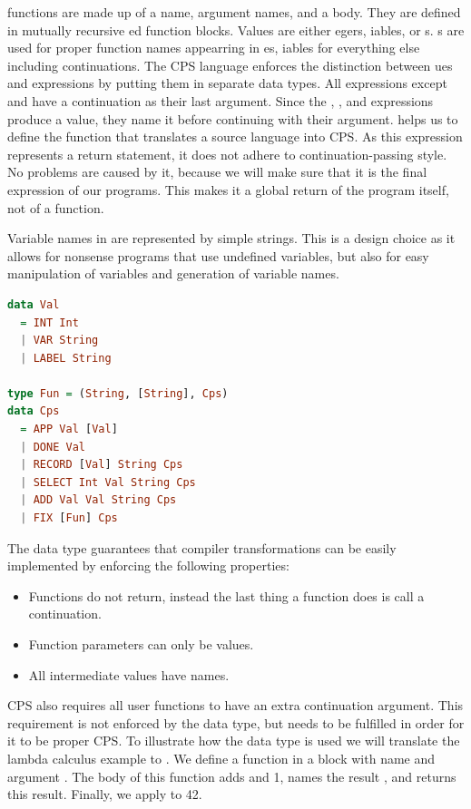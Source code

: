 { functions are made up of a name, argument names, and a body. They are defined in mutually recursive ed function blocks. Values are either egers, iables, or s. s are used for proper function names appearring in es, iables for everything else including continuations. The CPS language enforces the distinction between ues and  expressions by putting them in separate data types. All expressions except  and  have a  continuation as their last argument. Since the , , and  expressions produce a value, they name it before continuing with their  argument.  helps us to define the function that translates a source language into CPS. As this expression represents a return statement, it does not adhere to continuation-passing style. No problems are caused by it, because we will make sure that it is the final expression of our programs. This makes it a global return of the program itself, not of a function.

Variable names in  are represented by simple strings. This is a design choice as it allows for nonsense programs that use undefined variables, but also for easy manipulation of variables and generation of variable names.

\begin{lstlisting}[language=Haskell]
data Val
  = INT Int
  | VAR String
  | LABEL String
  
type Fun = (String, [String], Cps)
data Cps
  = APP Val [Val]
  | DONE Val
  | RECORD [Val] String Cps
  | SELECT Int Val String Cps
  | ADD Val Val String Cps
  | FIX [Fun] Cps
\end{lstlisting}

The  data type guarantees that compiler transformations can be easily implemented by enforcing the following properties:
\begin{itemize}
\item Functions do not return, instead the last thing a function does is call a continuation.
\item Function parameters can only be values.
\item All intermediate values have names.
\end{itemize}

CPS also requires all user functions to have an extra continuation argument. This requirement is not enforced by the data type, but needs to be fulfilled in order for it to be proper CPS. To illustrate how the  data type is used we will translate the lambda calculus example  to . We define a function in a  block with name  and argument . The body of this function adds  and 1, names the result , and returns this result. Finally, we apply  to 42.

}

